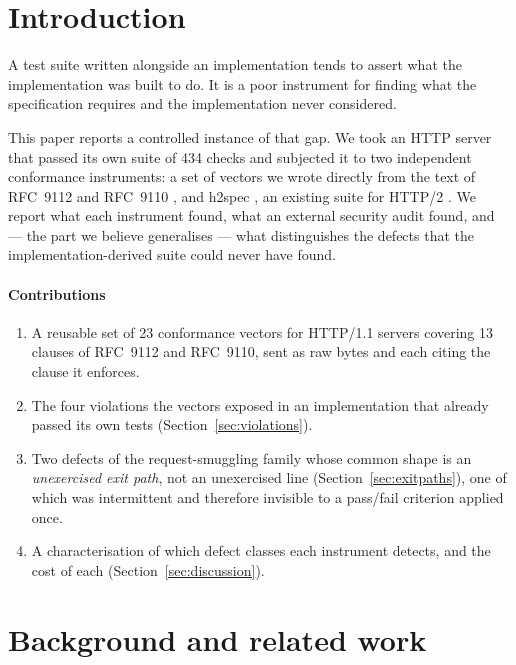 \documentclass[preprint,12pt]{elsarticle}
\begin{document}
\section{Introduction}
\label{sec:introduction}

A test suite written alongside an implementation tends to assert what the
implementation was built to do. It is a poor instrument for finding what the
specification requires and the implementation never considered.

This paper reports a controlled instance of that gap. We took an HTTP server
that passed its own suite of 434 checks and subjected it to two independent
conformance instruments: a set of vectors we wrote directly from the text of
RFC~9112 \cite{rfc9112} and RFC~9110 \cite{rfc9110}, and h2spec
\cite{h2spec}, an existing suite for HTTP/2 \cite{rfc9113}. We report what each
instrument found, what an external security audit found, and --- the part we
believe generalises --- what distinguishes the defects that the
implementation-derived suite could never have found.

\paragraph{Contributions}
\begin{enumerate}
  \item A reusable set of 23 conformance vectors for HTTP/1.1 servers covering
        13 clauses of RFC~9112 and RFC~9110, sent as raw bytes and each citing
        the clause it enforces.
  \item The four violations the vectors exposed in an implementation that
        already passed its own tests (Section~\ref{sec:violations}).
  \item Two defects of the request-smuggling family whose common shape is an
        \emph{unexercised exit path}, not an unexercised line
        (Section~\ref{sec:exitpaths}), one of which was intermittent and
        therefore invisible to a pass/fail criterion applied once.
  \item A characterisation of which defect classes each instrument detects, and
        the cost of each (Section~\ref{sec:discussion}).
\end{enumerate}

\section{Background and related work}
\label{sec:background}
\end{document}
